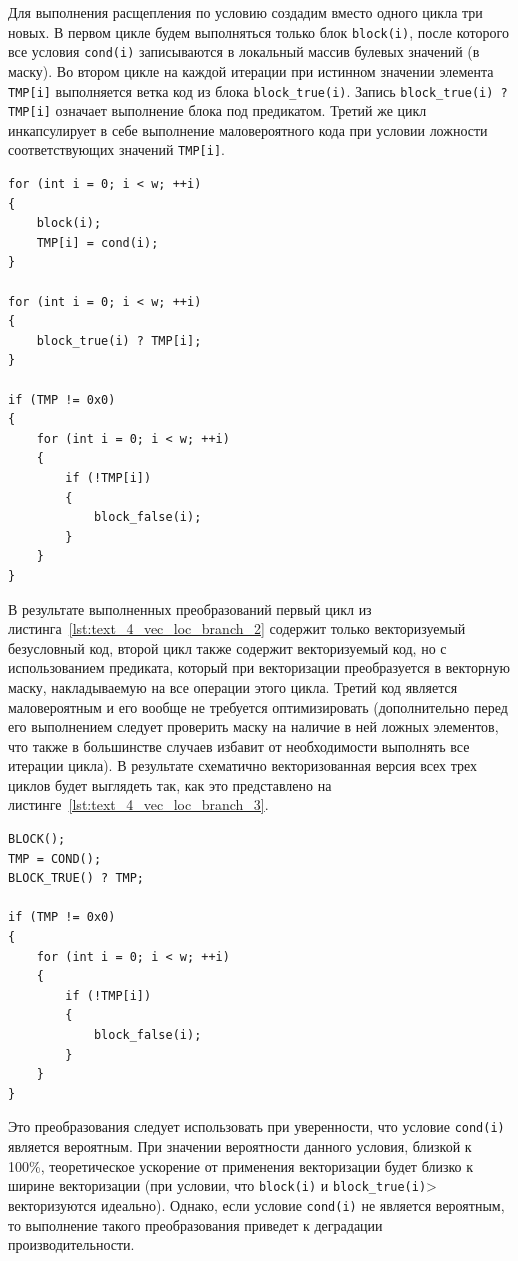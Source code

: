 Для выполнения расщепления по условию создадим вместо одного цикла три новых.
В первом цикле будем выполняться только блок \texttt{block(i)}, после которого все условия \texttt{cond(i)} записываются в локальный массив булевых значений (в маску).
Во втором цикле на каждой итерации при истинном значении элемента \texttt{TMP[i]} выполняется ветка код из блока \texttt{block\_true(i)}.
Запись \texttt{block\_true(i) ? TMP[i]} означает выполнение блока под предикатом.
Третий же цикл инкапсулирует в себе выполнение маловероятного кода при условии ложности соответствующих значений \texttt{TMP[i]}.

\begin{lstlisting}[caption={Расщепление плоского цикла с маловероятным регионом.},label={lst:text_4_vec_loc_branch_2}]
for (int i = 0; i < w; ++i)
{
    block(i);
    TMP[i] = cond(i);
}

for (int i = 0; i < w; ++i)
{
    block_true(i) ? TMP[i];
}

if (TMP != 0x0)
{
    for (int i = 0; i < w; ++i)
    {
        if (!TMP[i])
        {
            block_false(i);
        }
    }
}
\end{lstlisting}

В результате выполненных преобразований первый цикл из листинга~\ref{lst:text_4_vec_loc_branch_2} содержит только векторизуемый безусловный код, второй цикл также содержит векторизуемый код, но с использованием предиката, который при векторизации преобразуется в векторную маску, накладываемую на все операции этого цикла.
Третий код является маловероятным и его вообще не требуется оптимизировать (дополнительно перед его выполнением следует проверить маску на наличие в ней ложных элементов, что также в большинстве случаев избавит от необходимости выполнять все итерации цикла).
В результате схематично векторизованная версия всех трех циклов будет выглядеть так, как это представлено на листинге~\ref{lst:text_4_vec_loc_branch_3}.

\begin{lstlisting}[caption={Векторизованная версия расщепленного плоского цикла с маловероятным регионом.},label={lst:text_4_vec_loc_branch_3}]
BLOCK();
TMP = COND();
BLOCK_TRUE() ? TMP;

if (TMP != 0x0)
{
    for (int i = 0; i < w; ++i)
    {
        if (!TMP[i])
        {
            block_false(i);
        }
    }
}
\end{lstlisting}

Это преобразования следует использовать при уверенности, что условие \texttt{cond(i)} является вероятным.
При значении вероятности данного условия, близкой к 100\%, теоретическое ускорение от применения векторизации будет близко к ширине векторизации (при условии, что \texttt{block(i)} и \texttt{block\_true(i)}> векторизуются идеально).
Однако, если условие \texttt{cond(i)} не является вероятным, то выполнение такого преобразования приведет к деградации производительности.

